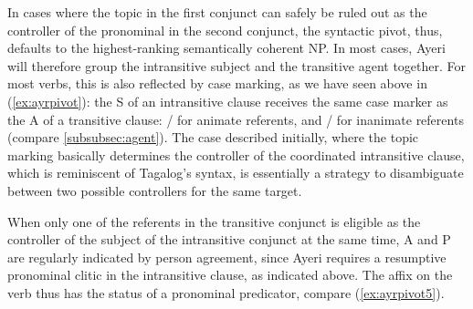 In cases where the topic in the first conjunct can safely be ruled out as the
controller of the pronominal in the second conjunct, the syntactic pivot, thus,
defaults to the highest-ranking semantically coherent NP. In most cases,
Ayeri will therefore group the intransitive subject and the transitive agent
together. For most verbs, this is also reflected by case marking, as we have
seen above in (\ref{ex:ayrpivot}): the S of an intransitive clause receives the
same case marker as the A of a transitive clause:
/ for animate referents, and
/ for inanimate referents (compare
\autoref{subsubsec:agent}). The case described initially, where the topic
marking basically determines the controller of the coordinated intransitive
clause, which is reminiscent of Tagalog's syntax, is essentially a strategy to
disambiguate between two possible controllers for the same target.

When only one of the referents in the transitive conjunct is eligible as the
controller of the subject of the intransitive conjunct at the same time, A and
P are regularly indicated by person agreement, since Ayeri requires a
resumptive pronominal clitic in the intransitive clause, as indicated above.
The affix on the verb thus has the status of a pronominal predicator, compare 
(\ref{ex:ayrpivot5}).

